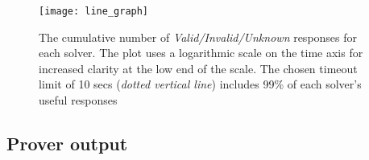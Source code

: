 \begin{figure}
	\centering
	\texttt{[image: line\_graph]}
	\caption{The cumulative number of \textit{Valid/Invalid/Unknown} responses for each solver. The plot uses a logarithmic scale on the time axis for increased clarity at the low end of the scale. The chosen timeout limit of 10 secs (\textit{dotted vertical line}) includes 99\% of each solver's useful responses}
	\label{fig:line_graph}
\end{figure}













\subsection{Prover output}





